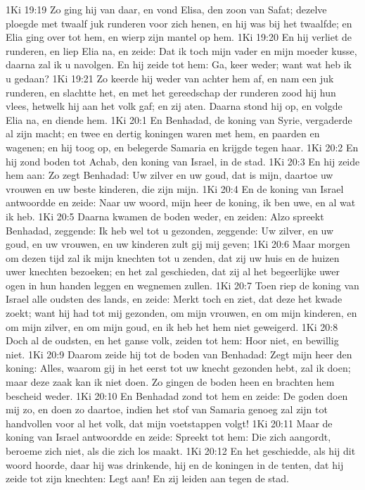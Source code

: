 1Ki 19:19  Zo ging hij van daar, en vond Elisa, den zoon van Safat; dezelve ploegde met twaalf juk runderen voor zich henen, en hij was bij het twaalfde; en Elia ging over tot hem, en wierp zijn mantel op hem.
1Ki 19:20  En hij verliet de runderen, en liep Elia na, en zeide: Dat ik toch mijn vader en mijn moeder kusse, daarna zal ik u navolgen. En hij zeide tot hem: Ga, keer weder; want wat heb ik u gedaan?
1Ki 19:21  Zo keerde hij weder van achter hem af, en nam een juk runderen, en slachtte het, en met het gereedschap der runderen zood hij hun vlees, hetwelk hij aan het volk gaf; en zij aten. Daarna stond hij op, en volgde Elia na, en diende hem.
1Ki 20:1  En Benhadad, de koning van Syrie, vergaderde al zijn macht; en twee en dertig koningen waren met hem, en paarden en wagenen; en hij toog op, en belegerde Samaria en krijgde tegen haar.
1Ki 20:2  En hij zond boden tot Achab, den koning van Israel, in de stad.
1Ki 20:3  En hij zeide hem aan: Zo zegt Benhadad: Uw zilver en uw goud, dat is mijn, daartoe uw vrouwen en uw beste kinderen, die zijn mijn.
1Ki 20:4  En de koning van Israel antwoordde en zeide: Naar uw woord, mijn heer de koning, ik ben uwe, en al wat ik heb.
1Ki 20:5  Daarna kwamen de boden weder, en zeiden: Alzo spreekt Benhadad, zeggende: Ik heb wel tot u gezonden, zeggende: Uw zilver, en uw goud, en uw vrouwen, en uw kinderen zult gij mij geven;
1Ki 20:6  Maar morgen om dezen tijd zal ik mijn knechten tot u zenden, dat zij uw huis en de huizen uwer knechten bezoeken; en het zal geschieden, dat zij al het begeerlijke uwer ogen in hun handen leggen en wegnemen zullen.
1Ki 20:7  Toen riep de koning van Israel alle oudsten des lands, en zeide: Merkt toch en ziet, dat deze het kwade zoekt; want hij had tot mij gezonden, om mijn vrouwen, en om mijn kinderen, en om mijn zilver, en om mijn goud, en ik heb het hem niet geweigerd.
1Ki 20:8  Doch al de oudsten, en het ganse volk, zeiden tot hem: Hoor niet, en bewillig niet.
1Ki 20:9  Daarom zeide hij tot de boden van Benhadad: Zegt mijn heer den koning: Alles, waarom gij in het eerst tot uw knecht gezonden hebt, zal ik doen; maar deze zaak kan ik niet doen. Zo gingen de boden heen en brachten hem bescheid weder.
1Ki 20:10  En Benhadad zond tot hem en zeide: De goden doen mij zo, en doen zo daartoe, indien het stof van Samaria genoeg zal zijn tot handvollen voor al het volk, dat mijn voetstappen volgt!
1Ki 20:11  Maar de koning van Israel antwoordde en zeide: Spreekt tot hem: Die zich aangordt, beroeme zich niet, als die zich los maakt.
1Ki 20:12  En het geschiedde, als hij dit woord hoorde, daar hij was drinkende, hij en de koningen in de tenten, dat hij zeide tot zijn knechten: Legt aan! En zij leiden aan tegen de stad.
